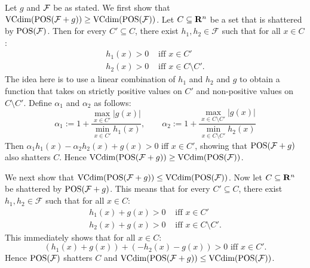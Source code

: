 Let $g$ and $\cal F$ be as stated. We first show that 
$\text{VCdim}(\operatorname{POS}(\mathcal{F} + g)) \geq \text{VCdim} (\operatorname{POS} (\mathcal{F}) )$. Let $C \subseteq \mathbf{R}^n$ be a 
set that is shattered by $\operatorname{POS}(\mathcal{F})$. Then for every $C' \subseteq C$, there exist
$h_1, h_2 \in \mathcal{F}$ such that for all $x \in C$:
\begin{align*}
    h_1(x) > 0 & \text { iff } x \in C' \\
    h_2(x) > 0 & \text{ iff } x \in C \setminus C'.
\end{align*}
The idea here is to use a linear combination of $h_1$ and $h_2$ and $g$ to obtain a function
that takes on strictly positive values on $C'$ and non-positive values on $C \setminus C'$. 
Define $\alpha_1$ and $\alpha_2$ as follows:
\[
\alpha_1 := 1 + \frac{\max_{x \in C'} |g(x)|}{\min_{x \in C'} h_1(x)}, \qquad 
\alpha_2 := 1 + \frac{{\max_{x \in C \setminus C'} |g(x)|}}{\min_{x \in C \setminus C'} h_2(x)}
\]
Then $\alpha_1 h_1(x) - \alpha_2 h_2(x) + g(x) > 0$ iff $x \in C'$, showing that
$\operatorname{POS} (\mathcal{F} + g)$ also shatters $C$. Hence 
$\text{VCdim}(\operatorname{POS}(\mathcal{F} + g)) \geq \text{VCdim} (\operatorname{POS} (\mathcal{F}) )$.

We next show that $\text{VCdim}(\operatorname{POS}(\mathcal{F} + g)) \leq \text{VCdim} (\operatorname{POS} (\mathcal{F}) )$. Now let 
$C \subseteq \mathbf{R}^n$ be shattered by $\operatorname{POS}(\mathcal{F} + g)$. This means that 
for every $C' \subseteq C$, there exist $h_1, h_2 \in \mathcal{F}$ such that for 
all $x \in C$:
\begin{align*}
    h_1(x) + g(x) > 0 & \text { iff } x \in C' \\
    h_2(x) + g(x) > 0 & \text{ iff } x \in C \setminus C'.
\end{align*}
This immediately shows that for all $x \in C$:
\[
    (h_1(x) + g(x)) + (- h_2(x) - g(x)) > 0 \text { iff } x \in C'. 
\]
Hence $\operatorname{POS} (\mathcal{F})$ shatters $C$ and
$\text{VCdim}(\operatorname{POS}(\mathcal{F} + g)) \leq \text{VCdim} (\operatorname{POS} (\mathcal{F}) )$. 

